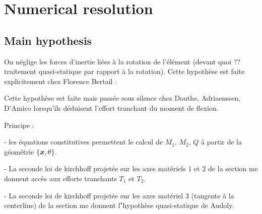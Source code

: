 \section{Numerical resolution}

\subsection{Main hypothesis}

On néglige les forces d'inertie liées à la rotation de l'élément  (devant quoi ?? traitement quasi-statique par rapport à la rotation). Cette hypothèse est faite explicitement chez Florence Bertail :



Cette hypothèse est faite mais passée sous silence chez Douthe, Adriaenssen, D'Amico lorsqu'ils déduisent l'effort tranchant du moment de flexion.

Principe :

- les équations constitutives permettent le calcul de $M_1$, $M_2$, $Q$ à partir de la géométrie $\{\boldsymbol{x},\theta\}$.

- La seconde loi de kirchhoff projetée sur les axes matériels 1 et 2 de la section me donnent accès aux efforts tranchants $T_1$ et $T_2$.

- La seconde loi de kirchhoff projetée sur les axes matériel 3 (tangente à la centerline) de la section me donnent l"hypothèse quasi-statique de Audoly.



